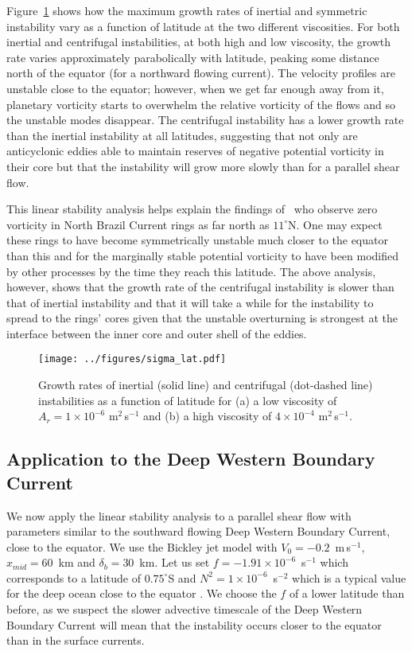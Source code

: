 Figure~\ref{fig:SigmaAndLat} shows how the maximum growth rates of inertial and symmetric instability vary as a function of latitude at the two different viscosities. For both inertial and centrifugal instabilities, at both high and low viscosity, the growth rate varies approximately parabolically with latitude, peaking some distance north of the equator (for a northward flowing current). The velocity profiles are unstable close to the equator; however, when we get far enough away from it, planetary vorticity starts to overwhelm the relative vorticity of the flows and so the unstable modes disappear. The centrifugal instability has a lower growth rate than the inertial instability at all latitudes, suggesting that not only are anticyclonic eddies able to maintain reserves of negative potential vorticity in their core but that the instability will grow more slowly than for a parallel shear flow.

This linear stability analysis helps explain the findings of~\citet{Castelao2011} who observe zero vorticity in North Brazil Current rings as far north as $11^\circ$N. One may expect these rings to have become symmetrically unstable much closer to the equator than this and for the marginally stable potential vorticity to have been modified by other processes by the time they reach this latitude. The above analysis, however, shows that the growth rate of the centrifugal instability is slower than that of inertial instability and that it will take a while for the instability to spread to the rings' cores given that the unstable overturning is strongest at the interface between the inner core and outer shell of the eddies.

\begin{figure}
    \centering
    \texttt{[image: ../figures/sigma\_lat.pdf]}
    \caption{Growth rates of inertial (solid line) and centrifugal (dot-dashed line) instabilities as a function of latitude for (a) a low viscosity of $A_r = 1 \times 10^{-6}$ m$^2\,$s$^{-1}$ and (b) a high viscosity of $4 \times 10^{-4}$ m$^2\,$s$^{-1}$.}
    \label{fig:SigmaAndLat}
\end{figure}

\subsection{Application to the Deep Western Boundary Current}
We now apply the linear stability analysis to a parallel shear flow with parameters similar to the southward flowing Deep Western Boundary Current, close to the equator. We use the Bickley jet model with $V_0 = - 0.2$~m$\,$s$^{-1}$, $x_{mid} = 60$~km and $\delta_b = 30$~km. Let us set $f = - 1.91 \times 10^{-6}$~s$^{-1}$ which corresponds to a latitude of $0.75^\circ$S and $N^2 = 1 \times 10^{-6}$~s$^{-2}$ which is a typical value for the deep ocean close to the equator \citep{Schott1993, Schott2005}. We choose the $f$ of a lower latitude than before, as we suspect the slower advective timescale of the Deep Western Boundary Current will mean that the instability occurs closer to the equator than in the surface currents\footnotemark.

